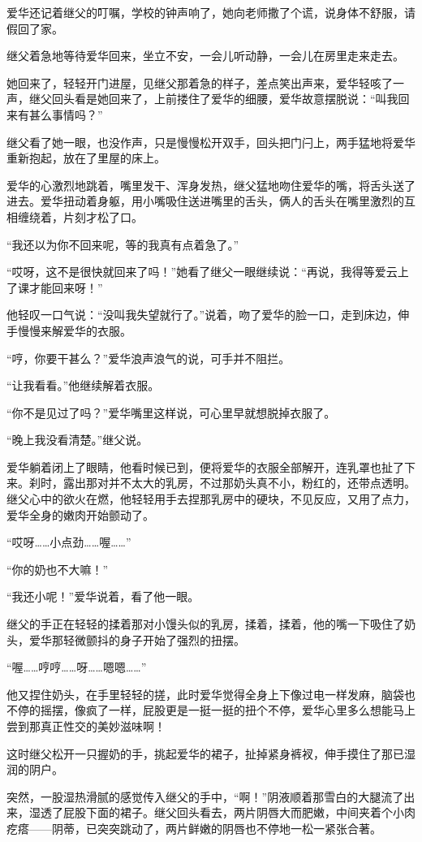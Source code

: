 \documentclass[12pt,UTF8]{ctexbook}
\begin{document}
爱华还记着继父的叮嘱，学校的钟声响了，她向老师撒了个谎，说身体不舒服，请假回了家。

继父着急地等待爱华回来，坐立不安，一会儿听动静，一会儿在房里走来走去。

她回来了，轻轻开门进屋，见继父那着急的样子，差点笑出声来，爱华轻咳了一声，继父回头看是她回来了，上前搂住了爱华的细腰，爱华故意摆脱说：“叫我回来有甚么事情吗？”

继父看了她一眼，也没作声，只是慢慢松开双手，回头把门闩上，两手猛地将爱华重新抱起，放在了里屋的床上。

爱华的心激烈地跳着，嘴里发干、浑身发热，继父猛地吻住爱华的嘴，将舌头送了进去。爱华扭动着身躯，用小嘴吸住送进嘴里的舌头，俩人的舌头在嘴里激烈的互相缠绕着，片刻才松了口。

“我还以为你不回来呢，等的我真有点着急了。”

“哎呀，这不是很快就回来了吗！”她看了继父一眼继续说：“再说，我得等爱云上了课才能回来呀！”

他轻叹一口气说：“没叫我失望就行了。”说着，吻了爱华的脸一口，走到床边，伸手慢慢来解爱华的衣服。

“哼，你要干甚么？”爱华浪声浪气的说，可手并不阻拦。

“让我看看。”他继续解着衣服。

“你不是见过了吗？”爱华嘴里这样说，可心里早就想脱掉衣服了。

“晚上我没看清楚。”继父说。

爱华躺着闭上了眼睛，他看时候已到，便将爱华的衣服全部解开，连乳罩也扯了下来。刹时，露出那对并不太大的乳房，不过那奶头真不小，粉红的，还带点透明。继父心中的欲火在燃，他轻轻用手去捏那乳房中的硬块，不见反应，又用了点力，爱华全身的嫩肉开始颤动了。

“哎呀……小点劲……喔……”

“你的奶也不大嘛！”

“我还小呢！”爱华说着，看了他一眼。

继父的手正在轻轻的揉着那对小馒头似的乳房，揉着，揉着，他的嘴一下吸住了奶头，爱华那轻微颤抖的身子开始了强烈的扭摆。

“喔……哼哼……呀……嗯嗯……”

他又捏住奶头，在手里轻轻的搓，此时爱华觉得全身上下像过电一样发麻，脑袋也不停的摇摆，像疯了一样，屁股更是一挺一挺的扭个不停，爱华心里多么想能马上尝到那真正性交的美妙滋味啊！

这时继父松开一只握奶的手，挑起爱华的裙子，扯掉紧身裤衩，伸手摸住了那已湿润的阴户。

突然，一股湿热滑腻的感觉传入继父的手中，“啊！”阴液顺着那雪白的大腿流了出来，湿透了屁股下面的裙子。继父回头看去，两片阴唇大而肥嫩，中间夹着个小肉疙瘩——阴蒂，已突突跳动了，两片鲜嫩的阴唇也不停地一松一紧张合著。
\end{document}

